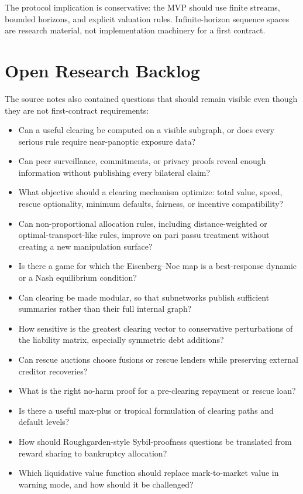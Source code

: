 \documentclass[11pt,oneside]{article}
\begin{document}
The protocol implication is conservative: the MVP should use finite streams,
bounded horizons, and explicit valuation rules. Infinite-horizon sequence
spaces are research material, not implementation machinery for a first
contract.

\section{Open Research Backlog}

The source notes also contained questions that should remain visible even
though they are not first-contract requirements:

\begin{itemize}[leftmargin=1.5em]
  \item Can a useful clearing be computed on a visible subgraph, or does every
  serious rule require near-panoptic exposure data?
  \item Can peer surveillance, commitments, or privacy proofs reveal enough
  information without publishing every bilateral claim?
  \item What objective should a clearing mechanism optimize: total value,
  speed, rescue optionality, minimum defaults, fairness, or incentive
  compatibility?
  \item Can non-proportional allocation rules, including distance-weighted or
  optimal-transport-like rules, improve on pari passu treatment without
  creating a new manipulation surface?
  \item Is there a game for which the Eisenberg--Noe map is a best-response
  dynamic or a Nash equilibrium condition?
  \item Can clearing be made modular, so that subnetworks publish sufficient
  summaries rather than their full internal graph?
  \item How sensitive is the greatest clearing vector to conservative
  perturbations of the liability matrix, especially symmetric debt additions?
  \item Can rescue auctions choose fusions or rescue lenders while preserving
  external creditor recoveries?
  \item What is the right no-harm proof for a pre-clearing repayment or rescue
  loan?
  \item Is there a useful max-plus or tropical formulation of clearing paths
  and default levels?
  \item How should Roughgarden-style Sybil-proofness questions be translated
  from reward sharing to bankruptcy allocation?
  \item Which liquidative value function should replace mark-to-market value in
  warning mode, and how should it be challenged?
\end{itemize}



\end{document}
